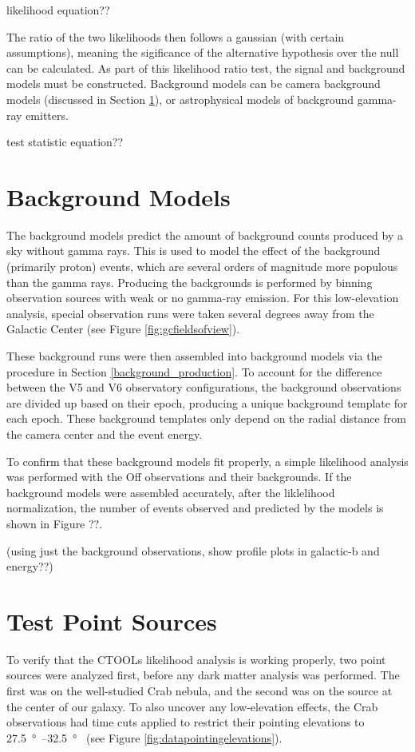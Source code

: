   {\color{red}likelihood equation??}
  
  The ratio of the two likelihoods then follows a gaussian (with certain assumptions), meaning the sigificance of the alternative hypothesis over the null can be calculated.
  As part of this likelihood ratio test, the signal and background models must be constructed.
  Background models can be camera background models (discussed in Section \ref{sec:bkgmodels}), or astrophysical models of background gamma-ray emitters.

  {\color{red}test statistic equation??}

\section{Background Models}\label{sec:bkgmodels}
  The background models predict the amount of background counts produced by a sky without gamma rays.
  This is used to model the effect of the background (primarily proton) events, which are several orders of magnitude more populous than the gamma rays.
  Producing the backgrounds is performed by binning observation sources with weak or no gamma-ray emission.
  For this low-elevation analysis, special observation runs were taken several degrees away from the Galactic Center (see Figure \ref{fig:gcfieldsofview}).

  These background runs were then assembled into background models via the procedure in Section \ref{background_production}.
  To account for the difference between the V5 and V6 observatory configurations, the background observations are divided up based on their epoch, producing a unique background template for each epoch.
  These background templates only depend on the radial distance from the camera center and the event energy.

  To confirm that these background models fit properly, a simple likelihood analysis was performed with the Off observations and their backgrounds.
  If the background models were assembled accurately, after the liklelihood normalization, the number of events observed and predicted by the models is shown in {\color{red}Figure ??}.

  {\color{red}(using just the background observations, show profile plots in galactic-b and energy??)}

\section{Test Point Sources}
  To verify that the CTOOLs likelihood analysis is working properly, two point sources were analyzed first, before any dark matter analysis was performed.
  The first was on the well-studied Crab nebula, and the second was on the source at the center of our galaxy.
  To also uncover any low-elevation effects, the Crab observations had time cuts applied to restrict their pointing elevations to \SIrange{27.5}{32.5}{\degree{}} (see Figure \ref{fig:datapointingelevations}).

